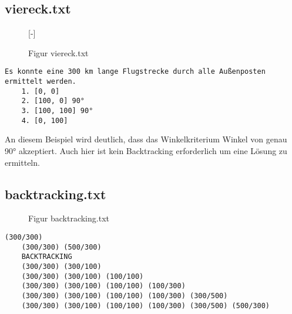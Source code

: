 \documentclass[a4paper,10pt,ngerman]{scrartcl}
\begin{document}
    \subsection{viereck.txt}\label{subsec:viereck.txt}

    \begin{figure}[H]
        [-]
        \FigurFuenf{}
        \caption{Figur viereck.txt}
        \label{fig:Figure3}
    \end{figure}

    \begin{lstlisting}[frame=single, title=Programmausgabe viereck.txt, breaklines=true,label={lst:lstlisting3}]
    Es konnte eine 300 km lange Flugstrecke durch alle Außenposten ermittelt werden.
    1. [0, 0]
    2. [100, 0] 90°
    3. [100, 100] 90°
    4. [0, 100]
    \end{lstlisting}

    An diesem Beispiel wird deutlich, dass das Winkelkriterium Winkel von genau 90° akzeptiert.
    Auch hier ist kein Backtracking erforderlich um eine Lösung zu ermitteln.

    \subsection{backtracking.txt}\label{subsec:backtracking.txt}

    \begin{figure}[H]
        \caption{Figur backtracking.txt}
        \label{fig:Figure8}
    \end{figure}

    \begin{lstlisting}[frame=single, title=Programmablaufausgabe backtracking.txt, breaklines=true,label={lst:lstlisting12}]
    (300/300)
    (300/300) (500/300)
    BACKTRACKING
    (300/300) (300/100)
    (300/300) (300/100) (100/100)
    (300/300) (300/100) (100/100) (100/300)
    (300/300) (300/100) (100/100) (100/300) (300/500)
    (300/300) (300/100) (100/100) (100/300) (300/500) (500/300)
    \end{lstlisting}
\end{document}
